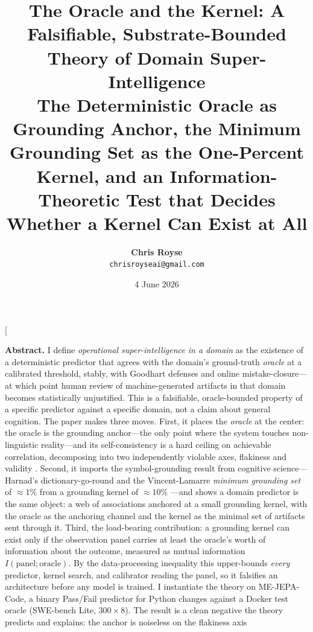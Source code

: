 \documentclass[10pt,twocolumn]{article}
\title{\vspace{-2.2em}\bfseries The Oracle and the Kernel: A Falsifiable,
Substrate-Bounded Theory of Domain Super-Intelligence\\[0.25em]
\normalsize\mdseries The Deterministic Oracle as Grounding Anchor, the
Minimum Grounding Set as the One-Percent Kernel, and an
Information-Theoretic Test that Decides Whether a Kernel Can Exist at All}
\author{\textbf{Chris Royse}\\[0.2em]
\texttt{chrisroyseai@gmail.com}}
\date{4 June 2026}
\begin{document}
\twocolumn[
\begin{@twocolumnfalse}
\maketitle
\vspace{-1.0em}
\begin{center}
\begin{minipage}{0.93\textwidth}
\small

\noindent\textbf{Abstract.}
I define \emph{operational super-intelligence in a domain} as the existence of a
deterministic predictor that agrees with the domain's ground-truth \emph{oracle}
at a calibrated threshold, stably, with Goodhart defenses and online
mistake-closure---at which point human review of machine-generated artifacts in
that domain becomes statistically unjustified. This is a falsifiable,
oracle-bounded property of a specific predictor against a specific domain, not a
claim about general cognition. The paper makes three moves. First, it places the
\emph{oracle} at the center: the oracle is the grounding anchor---the only point
where the system touches non-linguistic reality---and its self-consistency is a
hard ceiling on achievable correlation, decomposing into two independently
violable axes, flakiness and validity \citep{aleithan2024swebenchplus,
wang2025solved, openai2026swebench}. Second, it imports the symbol-grounding
result from cognitive science---Harnad's dictionary-go-round
\citeyearpar{harnad1990symbol} and the Vincent-Lamarre \emph{minimum grounding
set} of $\approx1\%$ from a grounding kernel of $\approx10\%$
\citeyearpar{vincentlamarre2016latent}---and shows a domain predictor is the same
object: a web of associations anchored at a small grounding kernel, with the
oracle as the anchoring channel and the kernel as the minimal set of artifacts
sent through it. Third, the load-bearing contribution: a grounding kernel can
exist only if the observation panel carries at least the oracle's worth of
information about the outcome, measured as mutual information
$I(\text{panel};\text{oracle})$. By the data-processing inequality
\citep{cover2006elements} this upper-bounds \emph{every} predictor, kernel
search, and calibrator reading the panel, so it falsifies an architecture before
any model is trained. I instantiate the theory on ME-JEPA-Code, a binary
\textsf{Pass}/\textsf{Fail} predictor for Python changes against a Docker test
oracle (SWE-bench Lite, $300\times8$). The result is a clean negative the theory
predicts and explains: the anchor is noiseless on the flakiness axis

\end{minipage}
\end{center}
\end{@twocolumnfalse}
\end{document}
